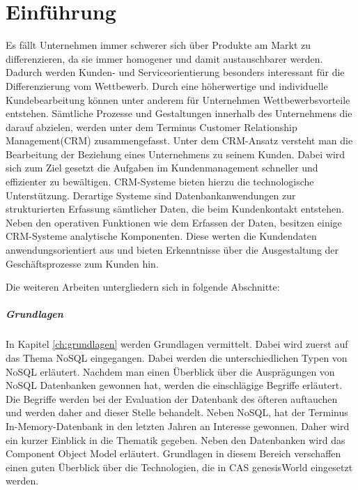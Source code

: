 
\chapter{Einführung}

Es fällt Unternehmen immer schwerer sich über Produkte am Markt zu differenzieren, da sie immer homogener und damit austauschbarer werden. Dadurch werden Kunden- und Serviceorientierung besonders interessant für die Differenzierung vom Wettbewerb. Durch eine höherwertige und individuelle Kundebearbeitung können unter anderem für Unternehmen Wettbewerbsvorteile entstehen. Sämtliche Prozesse und Gestaltungen innerhalb des Unternehmens die darauf abzielen, werden unter dem Terminus Customer Relationship Management(CRM) zusammengefasst. Unter dem CRM-Ansatz versteht man die Bearbeitung der Beziehung eines Unternehmens zu seinem Kunden. Dabei wird sich zum Ziel gesetzt die Aufgaben im Kundenmanagement schneller und effizienter zu bewältigen. CRM-Systeme bieten hierzu die technologische Unterstützung.  Derartige Systeme sind Datenbankanwendungen zur strukturierten Erfassung sämtlicher Daten, die beim Kundenkontakt entstehen. Neben den operativen Funktionen wie dem Erfassen der Daten, besitzen einige CRM-Systeme analytische Komponenten. Diese werten die Kundendaten anwendungsorientiert aus und bieten Erkenntnisse über die Ausgestaltung der Geschäftsprozesse zum Kunden hin.

Die weiteren Arbeiten untergliedern sich in folgende Abschnitte:
     
\paragraph{Grundlagen} In Kapitel \ref{ch:grundlagen} werden Grundlagen vermittelt. Dabei wird zuerst auf das Thema NoSQL eingegangen. Dabei werden die unterschiedlichen Typen von NoSQL erläutert. Nachdem man einen Überblick über die Ausprägungen von NoSQL Datenbanken gewonnen hat, werden die einschlägige Begriffe erläutert. Die Begriffe werden bei der Evaluation der Datenbank des öfteren auftauchen und werden daher and dieser Stelle behandelt. Neben NoSQL, hat der Terminus In-Memory-Datenbank in den letzten Jahren an Interesse gewonnen. Daher wird ein kurzer Einblick in die Thematik gegeben. Neben den Datenbanken wird das Component Object Model erläutert. Grundlagen in diesem Bereich verschaffen einen guten Überblick über die Technologien, die in CAS genesisWorld eingesetzt werden. 

